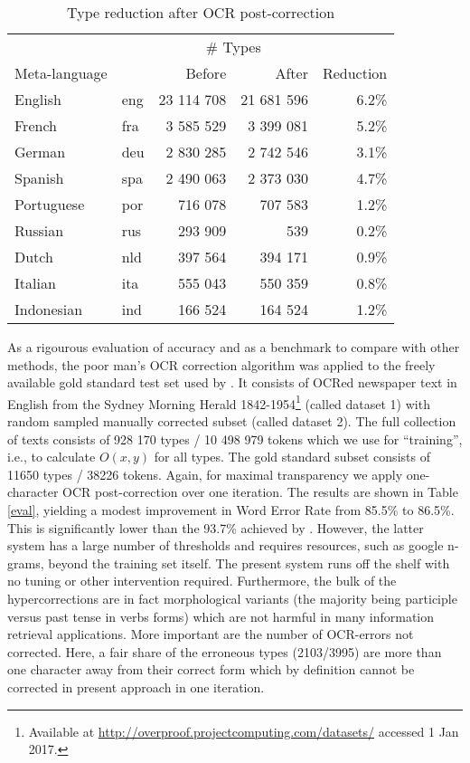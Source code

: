 \documentclass{sig-alternate}
\begin{document}
\begin{table}
\centering
\caption{Type reduction after OCR post-correction}
\label{typered}
\begin{tabular}{l|l|r|r|r}
              & & \multicolumn{2}{|c|}{\# Types}\\
Meta-language & & Before & After & Reduction\\ \hline
English & eng & 23 114 708 & 21 681 596 & 6.2\%\\
French & fra & 3 585 529 & 3 399 081 & 5.2\%\\
German & deu & 2 830 285 & 2 742 546 & 3.1\%\\
Spanish & spa & 2 490 063 & 2 373 030 & 4.7\%\\
Portuguese & por & 716 078 & 707 583 & 1.2\%\\
Russian & rus & 293 909 & 539 & 0.2\%\\
Dutch & nld & 397 564 & 394 171 & 0.9\%\\
Italian & ita & 555 043 & 550 359 & 0.8\%\\
Indonesian & ind & 166 524 & 164 524 & 1.2\%\\
\end{tabular}
\end{table}

As a rigourous evaluation of accuracy and as a benchmark to compare
with other methods, the poor man's OCR correction algorithm was
applied to the freely available gold standard test set used by
\cite{ocr:Evershed}.  It consists of OCRed newspaper text in English
from the Sydney Morning Herald 1842-1954\footnote{Available at
  \url{http://overproof.projectcomputing.com/datasets/} accessed 1 Jan
  2017.} (called dataset 1) with random sampled manually corrected
subset (called dataset 2). The full collection of texts consists of
928 170 types / 10 498 979 tokens which we use for ``training'', i.e.,
to calculate $O(x, y)$ for all types. The gold standard subset
consists of 11650 types / 38226 tokens. Again, for maximal
transparency we apply one-character OCR post-correction over one
iteration. The results are shown in Table \ref{eval}, yielding a
modest improvement in Word Error Rate from 85.5\% to 86.5\%. This is
significantly lower than the 93.7\% achieved by
\cite{ocr:Evershed}. However, the latter system has a large number of
thresholds and requires resources, such as google n-grams, beyond the
training set itself. The present system runs off the shelf with
no tuning or other intervention required. Furthermore, the bulk of
the hypercorrections are in fact morphological variants (the majority
being participle versus past tense in verbs forms) which are not
harmful in many information retrieval applications. More important
are the number of OCR-errors not corrected. Here, a fair share of
the erroneous types (2103/3995) are more than one character away from
their correct form which by definition cannot be corrected in present
approach in one iteration.
\end{document}
